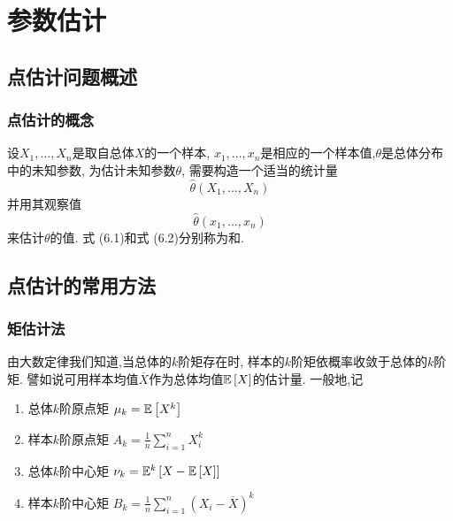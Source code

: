 \chapter{参数估计}
\section{点估计问题概述}
\subsection{点估计的概念}
设$X_1,\ldots,X_n$是取自总体$X$的一个样本, $x_1,\ldots,x_n$是相应的一个样本值,$\theta$是总体分布中的未知参数, 为估计未知参数$\theta$, 需要构造一个适当的统计量
\begin{equation}
    \hat{\theta}(X_1,\ldots,X_n)
\end{equation}
并用其观察值
\begin{equation}
    \hat{\theta}(x_1,\ldots,x_n)
\end{equation}
来估计$\theta$的值. 式 (6.1)和式 (6.2)分别称为和.
\section{点估计的常用方法}
\subsection{矩估计法}
由大数定律我们知道,当总体的$k$阶矩存在时, 样本的$k$阶矩依概率收敛于总体的$k$阶矩. 譬如说可用样本均值$\overline{X}$作为总体均值$\EE{X}$的估计量. 一般地,记
\begin{enumerate}
    \item 总体$k$阶原点矩 $\mu_k=\EE{X^k}$
    \item 样本$k$阶原点矩 $A_k=\frac{1}{n}\sum_{i=1}^nX_i^k$
    \item 总体$k$阶中心矩 $\nu_k=\EE[k]{X-\EE{X}}$
    \item 样本$k$阶中心矩 $B_k=\frac{1}{n}\sum_{i=1}^n(X_i-\overline{X})^k$
\end{enumerate}

